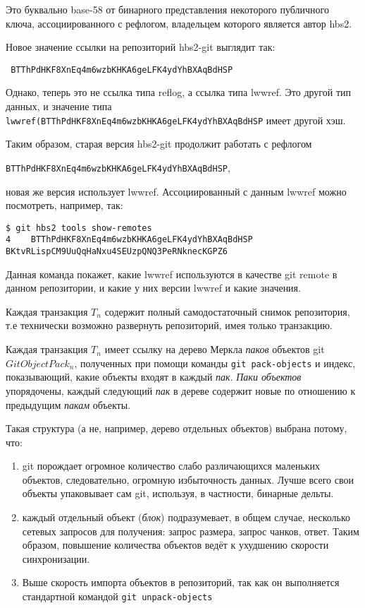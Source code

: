 \documentclass[11pt,a4paper]{article}
\begin{document}
 Это буквально base-58 от бинарного представления некоторого публичного ключа, ассоциированного с
 рефлогом, владельцем которого является автор hbs2.

 Новое значение ссылки на репозиторий hbs2-git выглядит так:

 \begin{verbatim}
 BTThPdHKF8XnEq4m6wzbKHKA6geLFK4ydYhBXAqBdHSP
 \end{verbatim}

 Однако, теперь это не ссылка типа reflog, а ссылка типа lwwref. Это другой тип данных,
 и значение типа \texttt{lwwref(BTThPdHKF8XnEq4m6wzbKHKA6geLFK4ydYhBXAqBdHSP}
 имеет другой хэш.

 Таким образом, старая версия hbs2-git продолжит работать с рефлогом

 \texttt{BTThPdHKF8XnEq4m6wzbKHKA6geLFK4ydYhBXAqBdHSP},

 новая же версия использует lwwref. Ассоциированный с данным lwwref можно посмотреть, например, так:

 \begin{verbatim}
$ git hbs2 tools show-remotes
4    BTThPdHKF8XnEq4m6wzbKHKA6geLFK4ydYhBXAqBdHSP BKtvRLispCM9UuQqHaNxu4SEUzpQNQ3PeRNknecKGPZ6
 \end{verbatim}

Данная команда покажет, какие lwwref используются в качестве git remote в данном репозитории,
и какие у них версии lwwref и какие значения.

Каждая транзакция $T_n$ содержит полный самодостаточный снимок репозитория, т.е технически
возможно развернуть репозиторий, имея только транзакцию.

Каждая транзакция $T_n$ имеет ссылку на дерево Меркла \textit{паков} объектов git
$GitObjectPack_n$, полученных при помощи команды \texttt{git pack-objects} и индекс,
показывающий, какие объекты входят в каждый \textit{пак}. \textit{Паки объектов} упорядочены,
каждый следующий \textit{пак} в дереве содержит новые по отношению к предыдущим \textit{пакам}
объекты.

Такая структура (а не, например, дерево отдельных объектов) выбрана потому, что:

\begin{enumerate}
  \item git порождает огромное количество слабо различающихся маленьких объектов, следовательно,
    огромную избыточность данных. Лучше всего свои объекты упаковывает сам git, используя, в
    частности, бинарные дельты.
  \item каждый отдельный объект (\textit{блок}) подразумевает, в общем случае, несколько
    сетевых запросов для получения: запрос размера, запрос чанков, ответ. Таким образом,
    повышение количества объектов ведёт к ухудшению скорости синхронизации.
  \item Выше скорость импорта объектов в репозиторий, так как он выполняется стандартной
    командой \texttt{git unpack-objects}
\end{enumerate}
\end{document}
